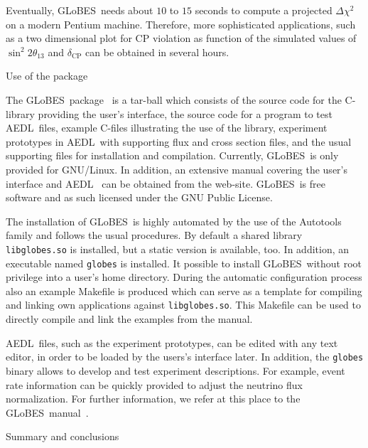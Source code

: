 \documentclass[12pt,a4paper]{article}
\makeatletter
\renewcommand{\section}{\@startsection{section}{1}{0em}{-\baselineskip}%
{\baselineskip}{\normalfont\large\bfseries}}
\newcommand{\deltacp}{\delta_{\mathrm{CP}}}
\newcommand{\stheta}{\sin^2 2 \theta_{13}}
\newcommand{\GLOBES}{{\sf GLoBES}}
\newcommand{\AEDL}{{\sf AEDL}}
\makeatother
\begin{document}
Eventually, \GLOBES\ needs about $10$ to $15$ seconds to compute
a projected $\Delta \chi^2$ on a modern Pentium machine. Therefore,
more sophisticated applications, such as a two dimensional plot
for CP violation as function of the simulated values of $\stheta$ and
$\deltacp$ can be obtained in several hours.

\section{Use of the package}

The \GLOBES\ package~\cite{Globes} is a tar-ball which consists of the
source code for the C-library providing the user's interface, the source code
 for a program to test
\AEDL\ files, example C-files illustrating the use of the library,
experiment prototypes in \AEDL\ with supporting flux and cross
section files, and the usual
supporting files for installation and compilation.
Currently, \GLOBES\ is only provided for GNU/Linux.
In addition, an extensive manual covering the user's interface and
\AEDL~\cite{Manual} 
can be obtained from the web-site. \GLOBES\ is free software and as such 
licensed under the GNU Public License.

The installation of \GLOBES\ is highly automated by the use of the
Autotools family and follows the usual procedures. By default
a shared library {\tt libglobes.so} is installed, but 
a static version is available, too. In addition, an executable named {\tt globes} is installed. It possible to install \GLOBES\ without
root privilege into a user's home directory. During the automatic
configuration process also an example Makefile is produced which can
serve as a template for compiling and linking own applications against
{\tt libglobes.so}. This Makefile can be used to directly compile and
link the examples
from the manual. 

\AEDL\ files, such as the experiment prototypes,
can be edited with any text editor, in order to be loaded by the
users's interface later. In addition, the {\tt globes} binary allows to
develop and test experiment descriptions. For example, event rate
information can be quickly provided to adjust the neutrino flux
normalization. For further information, we refer
at this place to the \GLOBES\ manual~\cite{Manual}.

\section{Summary and conclusions}
\end{document}
